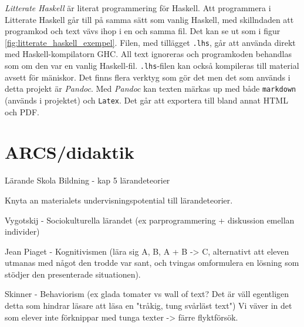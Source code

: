 \begin{draft}
\textit{Litterate Haskell} är literat programmering för Haskell.\cite{litterate_haskell}
Att programmera i Litterate Haskell går till på samma sätt som vanlig Haskell,
med skillndaden att programkod och text vävs ihop i en och samma fil. Det kan
se ut som i figur \ref{fig:litterate_haskell_exempel}. Filen, med tillägget
\texttt{.lhs}, går att använda direkt med Haskell-kompilatorn GHC. All text
ignoreras och programkoden behandlas som om den var en vanlig
Haskell-fil. \texttt{.lhs}-filen kan också kompileras till material avsett för
mäniskor. Det finns flera verktyg som gör det men det som används i detta
projekt är \textit{Pandoc}\cite{pandoc}. Med \textit{Pandoc} kan texten märkas
up med både \texttt{markdown} (används i projektet) och \texttt{Latex}. Det går
att exportera till bland annat HTML och PDF.
\end{draft}

\section{ARCS/didaktik}
\label{sec:arcs}


\begin{binge}

Lärande Skola Bildning - kap 5 lärandeteorier

Knyta an materialets undervisningspotential till lärandeteorier.

Vygotskij - Sociokulturella lärandet (ex parprogrammering + diskussion emellan individer)

Jean Piaget - Kognitivismen (lära sig A, B, A + B -> C, alternativt att eleven utmanas med något den trodde var sant, och tvingas omformulera en lösning som stödjer den presenterade situationen).

Skinner - Behaviorism (ex glada tomater vs wall of text? Det är väll egentligen detta som hindrar läsare att läsa en "tråkig, tung svårläst text")
Vi väver in det som elever inte förknippar med tunga texter -> färre flyktförsök.

\end{binge}
